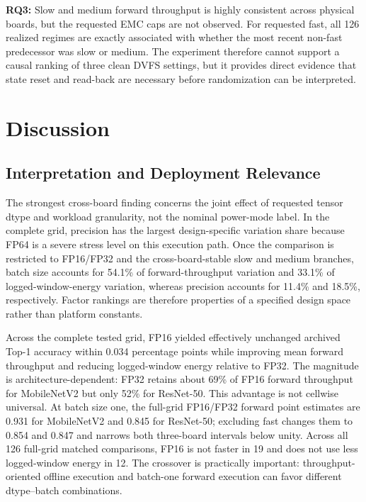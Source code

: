 \documentclass[electronics,article,submit,pdftex,moreauthors]{Definitions/mdpi}
\newcommand{\mobile}{MobileNetV2}
\newcommand{\resnet}{ResNet-50}
\begin{document}
\textbf{RQ3:} Slow and medium forward throughput is highly consistent across physical boards, but the requested EMC caps are not observed. For requested fast, all 126 realized regimes are exactly associated with whether the most recent non-fast predecessor was slow or medium. The experiment therefore cannot support a causal ranking of three clean DVFS settings, but it provides direct evidence that state reset and read-back are necessary before randomization can be interpreted.

\section{Discussion}

\subsection{Interpretation and Deployment Relevance}

The strongest cross-board finding concerns the joint effect of requested tensor dtype and workload granularity, not the nominal power-mode label. In the complete grid, precision has the largest design-specific variation share because FP64 is a severe stress level on this execution path. Once the comparison is restricted to FP16/FP32 and the cross-board-stable slow and medium branches, batch size accounts for 54.1\% of forward-throughput variation and 33.1\% of logged-window-energy variation, whereas precision accounts for 11.4\% and 18.5\%, respectively. Factor rankings are therefore properties of a specified design space rather than platform constants.

Across the complete tested grid, FP16 yielded effectively unchanged archived Top-1 accuracy within 0.034 percentage points while improving mean forward throughput and reducing logged-window energy relative to FP32. The magnitude is architecture-dependent: FP32 retains about 69\% of FP16 forward throughput for \mobile{} but only 52\% for \resnet{}. This advantage is not cellwise universal. At batch size one, the full-grid FP16/FP32 forward point estimates are 0.931 for \mobile{} and 0.845 for \resnet{}; excluding fast changes them to 0.854 and 0.847 and narrows both three-board intervals below unity. Across all 126 full-grid matched comparisons, FP16 is not faster in 19 and does not use less logged-window energy in 12. The crossover is practically important: throughput-oriented offline execution and batch-one forward execution can favor different dtype--batch combinations.
\end{document}
